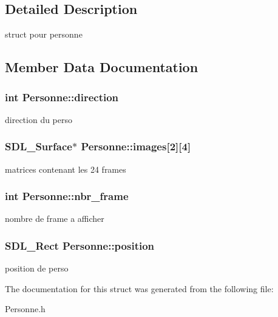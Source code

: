\subsection{Detailed Description}
struct pour personne 

\subsection{Member Data Documentation}
\subsubsection[{\texorpdfstring{direction}{direction}}]{\setlength{\rightskip}{0pt plus 5cm}int Personne\+::direction}\hypertarget{structPersonne_abf281355a0155c510a69d50acc03e0f1}{}\label{structPersonne_abf281355a0155c510a69d50acc03e0f1}
direction du perso 
\subsubsection[{\texorpdfstring{images}{images}}]{\setlength{\rightskip}{0pt plus 5cm}S\+D\+L\+\_\+\+Surface$\ast$ Personne\+::images\mbox{[}2\mbox{]}\mbox{[}4\mbox{]}}\hypertarget{structPersonne_a692200a902f41147fb2d5189720815dd}{}\label{structPersonne_a692200a902f41147fb2d5189720815dd}
matrices contenant les 24 frames 
\subsubsection[{\texorpdfstring{nbr\+\_\+frame}{nbr_frame}}]{\setlength{\rightskip}{0pt plus 5cm}int Personne\+::nbr\+\_\+frame}\hypertarget{structPersonne_a0fe6259a45ccfe5f2b2e7a7b24d5c15d}{}\label{structPersonne_a0fe6259a45ccfe5f2b2e7a7b24d5c15d}
nombre de frame a afficher 
\subsubsection[{\texorpdfstring{position}{position}}]{\setlength{\rightskip}{0pt plus 5cm}S\+D\+L\+\_\+\+Rect Personne\+::position}\hypertarget{structPersonne_a4f59668cc98be99d36193946c4153ef2}{}\label{structPersonne_a4f59668cc98be99d36193946c4153ef2}
position de perso 

The documentation for this struct was generated from the following file\+:\begin{DoxyCompactItemize}
\item 
Personne.\+h\end{DoxyCompactItemize}
